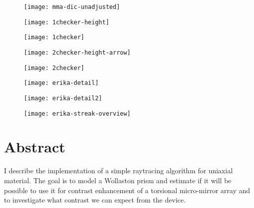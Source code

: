 \begin{figure}[htbp]
  \centering
  \texttt{[image: mma-dic-unadjusted]}
  \caption{}
  \label{fig:mma-dic-unadjusted}
\end{figure}
\begin{figure}[htbp]
  \centering
  \texttt{[image: 1checker-height]}
  \caption{}
  \label{fig:1checker-height}
\end{figure}
\begin{figure}[htbp]
  \centering
  \texttt{[image: 1checker]}
  \caption{}
  \label{fig:1checker}
\end{figure}
\begin{figure}[htbp]
  \centering
  \texttt{[image: 2checker-height-arrow]}
  \caption{}
  \label{fig:height-arrow}
\end{figure}
\begin{figure}[htbp]
  \centering
  \texttt{[image: 2checker]}
  \caption{}
  \label{fig:2checker}
\end{figure}
\begin{figure}[htbp]
  \centering
  \texttt{[image: erika-detail]}
  \caption{}
  \label{fig:detail}
\end{figure}

\begin{figure}[htbp]
  \centering
  \texttt{[image: erika-detail2]}
  \caption{}
  \label{fig:detail2}
\end{figure}

\begin{figure}[htbp]
  \centering
  \texttt{[image: erika-streak-overview]}
  \caption{}
  \label{fig:streak}
\end{figure}

\section{Abstract}
I describe the implementation of a simple raytracing algorithm for
uniaxial material.  The goal is to model a Wollaston prism and
estimate if it will be possible to use it for contrast enhancement of
a torsional micro-mirror array and to investigate what contrast we can
expect from the device.
